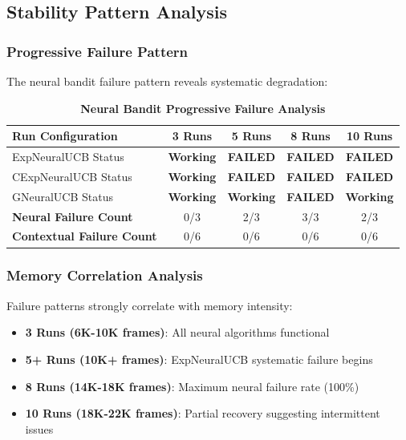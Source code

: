 \documentclass[12pt,a4paper]{article}
\newcommand{\critical}[1]{\textcolor{criticalcolor}{\textbf{#1}}}
\newcommand{\success}[1]{\textcolor{successcolor}{\textbf{#1}}}
\begin{document}
\subsection{Stability Pattern Analysis}

\subsubsection{Progressive Failure Pattern}

The neural bandit failure pattern reveals systematic degradation:

\begin{table}[H]
\centering
\caption{\critical{Neural Bandit Progressive Failure Analysis}}
\begin{tabular}{|l|c|c|c|c|}
\hline
\textbf{Run Configuration} & \textbf{3 Runs} & \textbf{5 Runs} & \textbf{8 Runs} & \textbf{10 Runs} \\
\hline
\hline
ExpNeuralUCB Status & \success{Working} & \critical{FAILED} & \critical{FAILED} & \critical{FAILED} \\
CExpNeuralUCB Status & \success{Working} & \critical{FAILED} & \critical{FAILED} & \critical{FAILED} \\
GNeuralUCB Status & \success{Working} & \success{Working} & \critical{FAILED} & \success{Working} \\
\hline
\textbf{Neural Failure Count} & 0/3 & 2/3 & 3/3 & 2/3 \\
\textbf{Contextual Failure Count} & 0/6 & 0/6 & 0/6 & 0/6 \\
\hline
\end{tabular}
\end{table}

\subsubsection{Memory Correlation Analysis}

Failure patterns strongly correlate with memory intensity:
\begin{itemize}
\item \textbf{3 Runs (6K-10K frames)}: All neural algorithms functional
\item \textbf{5+ Runs (10K+ frames)}: ExpNeuralUCB systematic failure begins
\item \textbf{8 Runs (14K-18K frames)}: Maximum neural failure rate (100\%)
\item \textbf{10 Runs (18K-22K frames)}: Partial recovery suggesting intermittent issues
\end{itemize}
\end{document}
